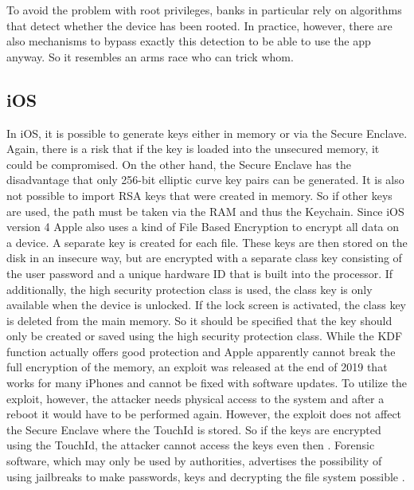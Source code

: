 \documentclass[12pt,oneside,a4paper,parskip]{scrbook}
\begin{document}
To avoid the problem with root privileges, banks in particular rely on algorithms that detect whether the device has been rooted. In practice, however, there are also mechanisms to bypass exactly this detection to be able to use the app anyway. So it resembles an arms race who can trick whom. \parencite{mulliner_safetynet_2017}

\subsection{iOS}
In iOS, it is possible to generate keys either in memory or via the Secure Enclave. Again, there is a risk that if the key is loaded into the unsecured memory, it could be compromised. On the other hand, the Secure Enclave has the disadvantage that only 256-bit elliptic curve key pairs can be generated. It is also not possible to import RSA keys that were created in memory. So if other keys are used, the path must be taken via the RAM and thus the Keychain. Since iOS version 4 Apple also uses a kind of File Based Encryption to encrypt all data on a device. A separate key is created for each file. These keys are then stored on the disk in an insecure way, but are encrypted with a separate class key consisting of the user password and a unique hardware ID that is built into the processor. If additionally, the high security protection class is used, the class key is only available when the device is unlocked. If the lock screen is activated, the class key is deleted from the main memory. So it should be specified that the key should only be created or saved using the high security protection class.
While the KDF function actually offers good protection and Apple apparently cannot break the full encryption of the memory, an exploit was released at the end of 2019 that works for many iPhones and cannot be fixed with software updates.  To utilize the exploit, however, the attacker needs physical access to the system and after a reboot it would have to be performed again. However, the exploit does not affect the Secure Enclave where the TouchId is stored. So if the keys are encrypted using the TouchId, the attacker cannot access the keys even then \parencite{reed_new_2019}. \newline
Forensic software, which may only be used by authorities, advertises the possibility of using jailbreaks to make passwords, keys and decrypting the file system possible \parencite{coltd_elcomsoft_nodate}.
\end{document}
